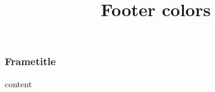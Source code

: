 \documentclass{ltx-talk}
\title{Footer colors}
\begin{document}
\begin{frame}
  \frametitle{Frametitle}
  content
\end{frame}
\end{document}

